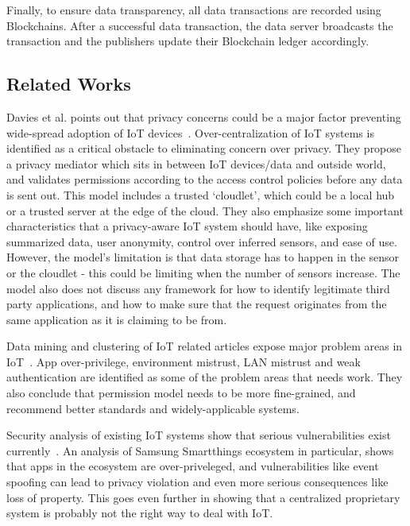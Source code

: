 Finally, to ensure data transparency, all data transactions are recorded using Blockchains. After a successful data transaction, the data server broadcasts the transaction and the publishers update their Blockchain ledger accordingly. 

\subsection{Related Works}
Davies et al. points out that privacy concerns could be a major factor preventing wide-spread adoption of IoT devices~\cite{davies}. Over-centralization of IoT systems is identified as a critical obstacle to eliminating concern over privacy. They propose a privacy mediator which sits in between IoT devices/data and outside world, and validates permissions according to the access control policies before any data is sent out. This model includes a trusted `cloudlet', which could be a local hub or a trusted server at the edge of the cloud. They also emphasize some important characteristics that a privacy-aware IoT system should have, like exposing summarized data, user anonymity, control over inferred sensors, and ease of use. However, the model's limitation is that data storage has to happen in the sensor or the cloudlet - this could be limiting when the number of sensors increase. The model also does not discuss any framework for how to identify legitimate third party applications, and how to make sure that the request originates from the same application as it is claiming to be from.

Data mining and clustering of IoT related articles expose major problem areas in IoT~\cite{zhang}. App over-privilege, environment mistrust, LAN mistrust and weak authentication are identified as some of the problem areas that needs work. They also conclude that permission model needs to be more fine-grained, and recommend better standards and widely-applicable systems.

Security analysis of existing IoT systems show that serious vulnerabilities exist currently~\cite{smartthings}. An analysis of Samsung Smartthings ecosystem in particular, shows that apps in the ecosystem are over-priveleged, and vulnerabilities like event spoofing can lead to privacy violation and even more serious consequences like loss of property. This goes even further in showing that a centralized proprietary system is probably not the right way to deal with IoT.
